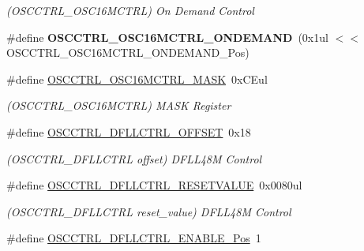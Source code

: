 \begin{DoxyCompactItemize}
\begin{DoxyCompactList}\small\item\em (O\+S\+C\+C\+T\+R\+L\+\_\+\+O\+S\+C16\+M\+C\+T\+R\+L) On Demand Control \end{DoxyCompactList}\item 
\hypertarget{group___s_a_m_l21___o_s_c_c_t_r_l_gace1cbfad08936354d669e1b1179856f4}{}\#define {\bfseries O\+S\+C\+C\+T\+R\+L\+\_\+\+O\+S\+C16\+M\+C\+T\+R\+L\+\_\+\+O\+N\+D\+E\+M\+A\+N\+D}~(0x1ul $<$$<$ O\+S\+C\+C\+T\+R\+L\+\_\+\+O\+S\+C16\+M\+C\+T\+R\+L\+\_\+\+O\+N\+D\+E\+M\+A\+N\+D\+\_\+\+Pos)\label{group___s_a_m_l21___o_s_c_c_t_r_l_gace1cbfad08936354d669e1b1179856f4}

\item 
\hypertarget{group___s_a_m_l21___o_s_c_c_t_r_l_gab28841bc6d3e53bf303cde45ad5dc7ab}{}\#define \hyperlink{group___s_a_m_l21___o_s_c_c_t_r_l_gab28841bc6d3e53bf303cde45ad5dc7ab}{O\+S\+C\+C\+T\+R\+L\+\_\+\+O\+S\+C16\+M\+C\+T\+R\+L\+\_\+\+M\+A\+S\+K}~0x\+C\+Eul\label{group___s_a_m_l21___o_s_c_c_t_r_l_gab28841bc6d3e53bf303cde45ad5dc7ab}

\begin{DoxyCompactList}\small\item\em (O\+S\+C\+C\+T\+R\+L\+\_\+\+O\+S\+C16\+M\+C\+T\+R\+L) M\+A\+S\+K Register \end{DoxyCompactList}\item 
\hypertarget{group___s_a_m_l21___o_s_c_c_t_r_l_ga3aede20224728205391836cf597b091e}{}\#define \hyperlink{group___s_a_m_l21___o_s_c_c_t_r_l_ga3aede20224728205391836cf597b091e}{O\+S\+C\+C\+T\+R\+L\+\_\+\+D\+F\+L\+L\+C\+T\+R\+L\+\_\+\+O\+F\+F\+S\+E\+T}~0x18\label{group___s_a_m_l21___o_s_c_c_t_r_l_ga3aede20224728205391836cf597b091e}

\begin{DoxyCompactList}\small\item\em (O\+S\+C\+C\+T\+R\+L\+\_\+\+D\+F\+L\+L\+C\+T\+R\+L offset) D\+F\+L\+L48\+M Control \end{DoxyCompactList}\item 
\hypertarget{group___s_a_m_l21___o_s_c_c_t_r_l_gab9cc89b31520086a17835af617948b5c}{}\#define \hyperlink{group___s_a_m_l21___o_s_c_c_t_r_l_gab9cc89b31520086a17835af617948b5c}{O\+S\+C\+C\+T\+R\+L\+\_\+\+D\+F\+L\+L\+C\+T\+R\+L\+\_\+\+R\+E\+S\+E\+T\+V\+A\+L\+U\+E}~0x0080ul\label{group___s_a_m_l21___o_s_c_c_t_r_l_gab9cc89b31520086a17835af617948b5c}

\begin{DoxyCompactList}\small\item\em (O\+S\+C\+C\+T\+R\+L\+\_\+\+D\+F\+L\+L\+C\+T\+R\+L reset\+\_\+value) D\+F\+L\+L48\+M Control \end{DoxyCompactList}\item 
\hypertarget{group___s_a_m_l21___o_s_c_c_t_r_l_gadafd90574f614ecc0d6293c8359359cf}{}\#define \hyperlink{group___s_a_m_l21___o_s_c_c_t_r_l_gadafd90574f614ecc0d6293c8359359cf}{O\+S\+C\+C\+T\+R\+L\+\_\+\+D\+F\+L\+L\+C\+T\+R\+L\+\_\+\+E\+N\+A\+B\+L\+E\+\_\+\+Pos}~1\label{group___s_a_m_l21___o_s_c_c_t_r_l_gadafd90574f614ecc0d6293c8359359cf}


\end{DoxyCompactItemize}
